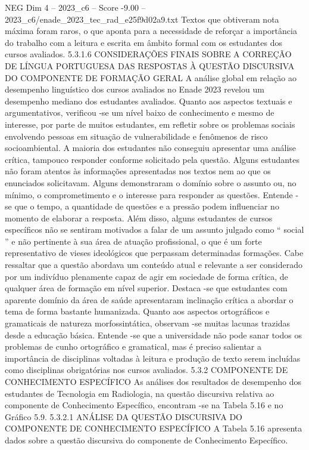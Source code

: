 \begin{textsample}{NEG Dim 4 – 2023\_c6 – Score -9.00 – 2023\_c6/enade\_2023\_tec\_rad\_e25f9d02a9.txt}
Textos que obtiveram nota máxima foram raros, o que aponta para a necessidade de reforçar a importância do trabalho com a leitura e escrita em âmbito formal com os estudantes dos cursos avaliados. 5.3.1.6 CONSIDERAÇÕES FINAIS SOBRE A CORREÇÃO DE LÍNGUA PORTUGUESA DAS RESPOSTAS À QUESTÃO DISCURSIVA DO COMPONENTE DE FORMAÇÃO GERAL A análise global em relação ao desempenho linguístico dos cursos avaliados no Enade 2023 revelou um desempenho mediano dos estudantes avaliados.
Quanto aos aspectos textuais e argumentativos, verificou -se um nível baixo de conhecimento e mesmo de interesse, por parte de muitos estudantes, em refletir sobre os problemas sociais envolvendo pessoas em situação de vulnerabilidade e fenômenos de risco socioambiental.
A maioria dos estudantes não conseguiu apresentar uma análise crítica, tampouco responder conforme solicitado pela questão.
Alguns estudantes não foram atentos às informações apresentadas nos textos nem ao que os enunciados solicitavam.
Alguns demonstraram o domínio sobre o assunto ou, no mínimo, o comprometimento e o interesse para responder as questões.
Entende -se que o tempo, a quantidade de questões e a pressão podem influenciar no momento de elaborar a resposta.
Além disso, alguns estudantes de cursos específicos não se sentiram motivados a falar de um assunto julgado como “ social ” e não pertinente à sua área de atuação profissional, o que é um forte representativo de vieses ideológicos que perpassam determinadas formações.
Cabe ressaltar que a questão abordava um conteúdo atual e relevante a ser considerado por um indivíduo plenamente capaz de agir em sociedade de forma crítica, de qualquer área de formação em nível superior.
Destaca -se que estudantes com aparente domínio da área de saúde apresentaram inclinação crítica a abordar o tema de forma bastante humanizada.
Quanto aos aspectos ortográficos e gramaticais de natureza morfossintática, observam -se muitas lacunas trazidas desde a educação básica.
Entende -se que a universidade não pode sanar todos os problemas de cunho ortográfico e gramatical, mas é preciso salientar a importância de disciplinas voltadas à leitura e produção de texto serem incluídas como disciplinas obrigatórias nos cursos avaliados. 5.3.2 COMPONENTE DE CONHECIMENTO ESPECÍFICO As análises dos resultados de desempenho dos estudantes de Tecnologia em Radiologia, na questão discursiva relativa ao componente de Conhecimento Específico, encontram -se na Tabela 5.16 e no Gráfico 5.9. 5.3.2.1 ANÁLISE DA QUESTÃO DISCURSIVA DO COMPONENTE DE CONHECIMENTO ESPECÍFICO A Tabela 5.16 apresenta dados sobre a questão discursiva do componente de Conhecimento Específico.

\end{textsample}

